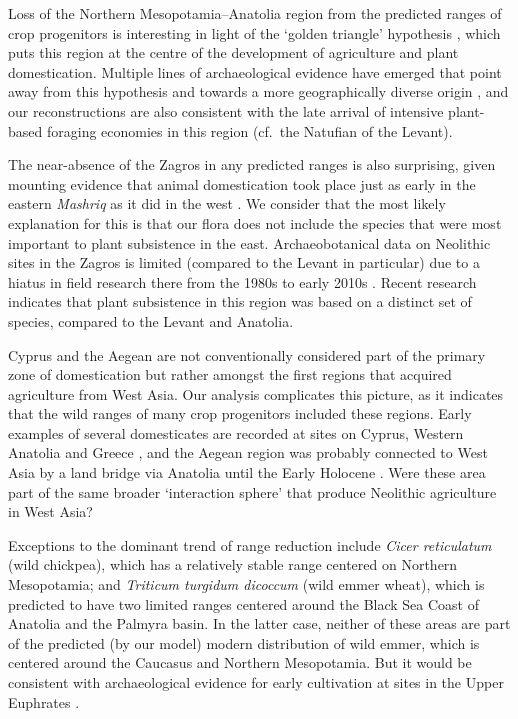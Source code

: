 \documentclass[
  authoryear,
  preprint]{elsarticle}
\begin{document}
Loss of the Northern Mesopotamia--Anatolia region from the predicted
ranges of crop progenitors is interesting in light of the `golden
triangle' hypothesis
\citep{Lev-YadunEtAl2000, KozlowskiAurenche2005, AbboEtAl2010}, which
puts this region at the centre of the development of agriculture and
plant domestication. Multiple lines of archaeological evidence have
emerged that point away from this hypothesis and towards a more
geographically diverse origin
\citep{Asouti2006, FullerEtAl2011, ArranzOtaeguiEtAl2016}, and our
reconstructions are also consistent with the late arrival of intensive
plant-based foraging economies in this region (cf.~the Natufian of the
Levant).

The near-absence of the Zagros in any predicted ranges is also
surprising, given mounting evidence that animal domestication took place
just as early in the eastern \emph{Mashriq} as it did in the west
\citep{Zeder2024}. We consider that the most likely explanation for this
is that our flora does not include the species that were most important
to plant subsistence in the east. Archaeobotanical data on Neolithic
sites in the Zagros is limited (compared to the Levant in particular)
due to a hiatus in field research there from the 1980s to early 2010s
\citep{Zeder2024}. Recent research
\citep{RiehlEtAl2013, WeideEtAl2017, WeideEtAl2018, WhitlamEtAl2018, GonzalezCarreteroEtAl2023}
indicates that plant subsistence in this region was based on a distinct
set of species, compared to the Levant and Anatolia.

Cyprus and the Aegean are not conventionally considered part of the
primary zone of domestication but rather amongst the first regions that
acquired agriculture from West Asia. Our analysis complicates this
picture, as it indicates that the wild ranges of many crop progenitors
included these regions. Early examples of several domesticates are
recorded at sites on Cyprus, Western Anatolia and Greece
\citep{ArranzOtaeguiRoe2023}, and the Aegean region was probably
connected to West Asia by a land bridge via Anatolia until the Early
Holocene \citep{AksuHiscott2022}. Were these area part of the same
broader `interaction sphere' that produce Neolithic agriculture in West
Asia?

Exceptions to the dominant trend of range reduction include \emph{Cicer
reticulatum} (wild chickpea), which has a relatively stable range
centered on Northern Mesopotamia; and \emph{Triticum turgidum dicoccum}
(wild emmer wheat), which is predicted to have two limited ranges
centered around the Black Sea Coast of Anatolia and the Palmyra basin.
In the latter case, neither of these areas are part of the predicted (by
our model) modern distribution of wild emmer, which is centered around
the Caucasus and Northern Mesopotamia. But it would be consistent with
archaeological evidence for early cultivation at sites in the Upper
Euphrates \citep{Willcox2024}.
\end{document}
